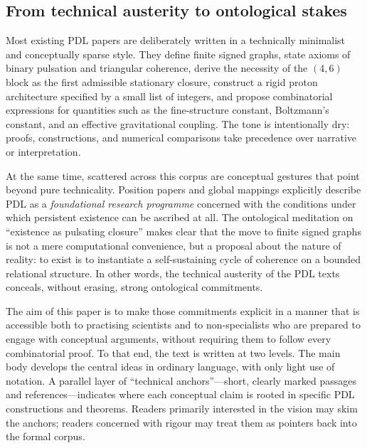 \documentclass[11pt,a4paper]{article}
\theoremstyle{definition}
\begin{document}
\subsection{From technical austerity to ontological stakes}

Most existing PDL papers are deliberately written in a technically minimalist and conceptually sparse style.\cite{Laubscher_EmergencePhysicalReality_2024,Laubscher_MinimalClosures_46_2024,Laubscher_ProtonArch_v2_2024,Laubscher_Alpha_v2_2024,Laubscher_EffectiveFields_2024,Laubscher_CavityModes_PDL_2024} They define finite signed graphs, state axioms of binary pulsation and triangular coherence, derive the necessity of the $(4,6)$ block as the first admissible stationary closure, construct a rigid proton architecture specified by a small list of integers, and propose combinatorial expressions for quantities such as the fine-structure constant, Boltzmann's constant, and an effective gravitational coupling. The tone is intentionally dry: proofs, constructions, and numerical comparisons take precedence over narrative or interpretation.

At the same time, scattered across this corpus are conceptual gestures that point beyond pure technicality. Position papers and global mappings explicitly describe PDL as a \emph{foundational research programme} concerned with the conditions under which persistent existence can be ascribed at all.\cite{Laubscher_PDL_Position_2024,Laubscher_PDL_GlobalMapping_v6_2024} The ontological meditation on ``existence as pulsating closure'' makes clear that the move to finite signed graphs is not a mere computational convenience, but a proposal about the nature of reality: to exist is to instantiate a self-sustaining cycle of coherence on a bounded relational structure.\cite{Laubscher_Existence_PulsatingClosure_2026} In other words, the technical austerity of the PDL texts conceals, without erasing, strong ontological commitments.

The aim of this paper is to make those commitments explicit in a manner that is accessible both to practising scientists and to non-specialists who are prepared to engage with conceptual arguments, without requiring them to follow every combinatorial proof. To that end, the text is written at two levels. The main body develops the central ideas in ordinary language, with only light use of notation. A parallel layer of ``technical anchors''---short, clearly marked passages and references---indicates where each conceptual claim is rooted in specific PDL constructions and theorems. Readers primarily interested in the vision may skim the anchors; readers concerned with rigour may treat them as pointers back into the formal corpus.
\end{document}
